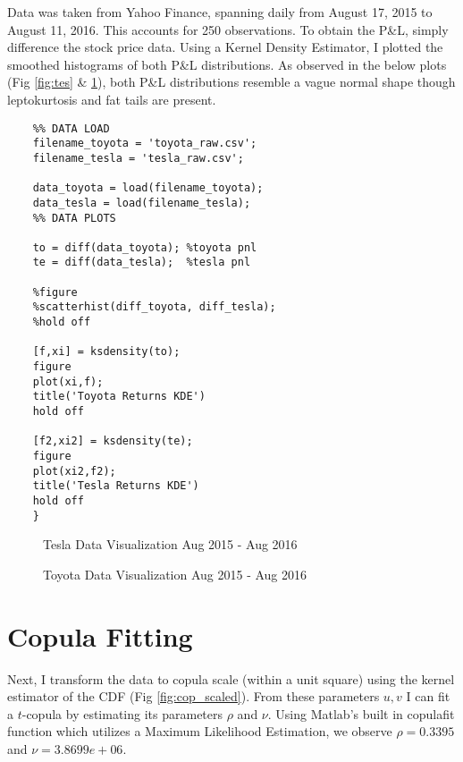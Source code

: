 \documentclass[titlepage]{article}
\begin{document}
Data was taken from Yahoo Finance, spanning daily from August 17, 2015 to August 11, 2016. This accounts for 250 observations. To obtain the P\&L, simply difference the stock price data. Using a Kernel Density Estimator, I plotted the smoothed histograms of both P\&L distributions. As observed in the below plots (Fig \ref{fig:tes} \& \ref{fig:toy}), both P\&L distributions resemble a vague normal shape though leptokurtosis and fat tails are present.

\begin{verbatim}
	%% DATA LOAD
	filename_toyota = 'toyota_raw.csv';
	filename_tesla = 'tesla_raw.csv';
	
	data_toyota = load(filename_toyota);
	data_tesla = load(filename_tesla);
	%% DATA PLOTS
	
	to = diff(data_toyota); %toyota pnl
	te = diff(data_tesla);  %tesla pnl
	
	%figure
	%scatterhist(diff_toyota, diff_tesla);
	%hold off
	
	[f,xi] = ksdensity(to);
	figure
	plot(xi,f);
	title('Toyota Returns KDE')
	hold off
	
	[f2,xi2] = ksdensity(te);
	figure
	plot(xi2,f2);
	title('Tesla Returns KDE')
	hold off
	}
\end{verbatim}

\begin{figure}
	\centering
	
	\qquad
	\qquad
	\qquad
	\caption{Tesla Data Visualization Aug 2015 - Aug 2016}
	\label{fig:tes}
	
	\qquad
	\qquad
	\caption{Toyota Data Visualization Aug 2015 - Aug 2016}
	\label{fig:toy}

\end{figure}

\section{Copula Fitting}
Next, I transform the data to copula scale (within a unit square) using the kernel estimator of the CDF (Fig \ref{fig:cop_scaled}). From these parameters $u,v$ I can fit a $t$-copula by estimating its parameters $\rho$ and $\nu$. Using Matlab's built in copulafit function which utilizes a Maximum Likelihood Estimation, we observe $\rho = 0.3395$ and $\nu = 3.8699e+06$. 
\medskip
\end{document}
